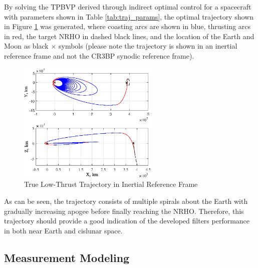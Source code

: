 \documentclass[letterpaper, submit]{AAS}			%
\begin{document}
By solving the TPBVP derived through indirect optimal control for a spacecraft with parameters shown in Table \ref{tab:traj_params}, the optimal trajectory shown in Figure \ref{fig:traj} was generated, where coasting arcs are shown in blue, thrusting arcs in red, the target NRHO in dashed black lines, and the location of the Earth and Moon as black $\times$ symbols (please note the trajectory is shown in an inertial reference frame and not the CR3BP synodic reference frame).
\begin{figure}[hbt!]
	\centering
	\includegraphics[width=0.6\textwidth]{./../../figures/iTraj.eps}
	\caption{True Low-Thrust Trajectory in Inertial Reference Frame}
	\label{fig:traj}
\end{figure}
As can be seen, the trajectory consists of multiple spirals about the Earth with gradually increasing apogee before finally reaching the NRHO. Therefore, this trajectory should provide a good indication of the developed filters performance in both near Earth and cislunar space.

\subsection{Measurement Modeling}
\end{document}
